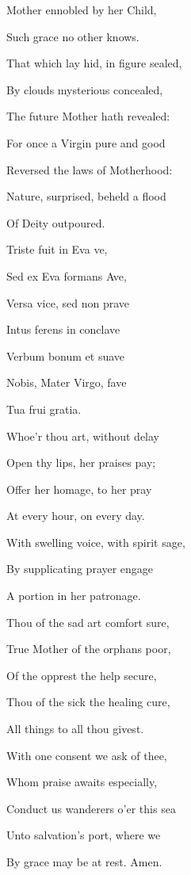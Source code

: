 \begin{multicols}{2}
Mother ennobled by her Child,

Such grace no other knows.\\
\par
That which lay hid, in figure sealed,

By clouds mysterious concealed,

The future Mother hath revealed:

For once a Virgin pure and good

Reversed the laws of Motherhood:

Nature, surprised, beheld a flood

Of Deity outpoured.\\
\par
{}
Triste fuit in Eva ve,

Sed ex Eva formans Ave,

Versa vice, sed non prave

Intus ferens in conclave

Verbum bonum et suave

Nobis, Mater Virgo, fave

Tua frui gratia.\\
\par
{}
Whoe'r thou art, without delay

Open thy lips, her praises pay;

Offer her homage, to her pray

At every hour, on every day.

With swelling voice, with spirit sage,

By supplicating prayer engage

A portion in her patronage.\\
\par
Thou of the sad art comfort sure,

True Mother of the orphans poor,

Of the opprest the help secure,

Thou of the sick the healing cure,

All things to all thou givest.

With one consent we ask of thee,

Whom praise awaits especially,

Conduct us wanderers o'er this sea

Unto salvation's port, where we

By grace may be at rest. Amen.
\end{multicols}
